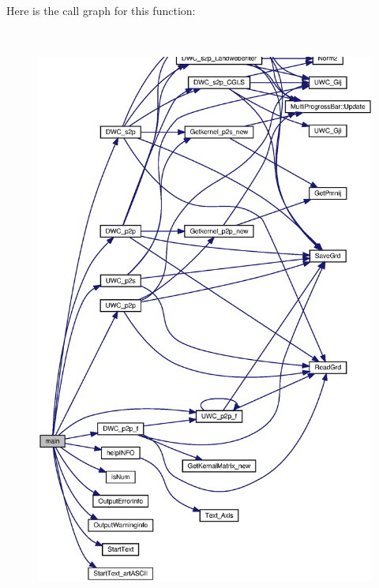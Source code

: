 Here is the call graph for this function\+:
\nopagebreak
\begin{figure}[H]
\begin{center}
\leavevmode
\includegraphics[height=550pt]{main_8cpp_a0ddf1224851353fc92bfbff6f499fa97_a0ddf1224851353fc92bfbff6f499fa97_cgraph}
\end{center}
\end{figure}
